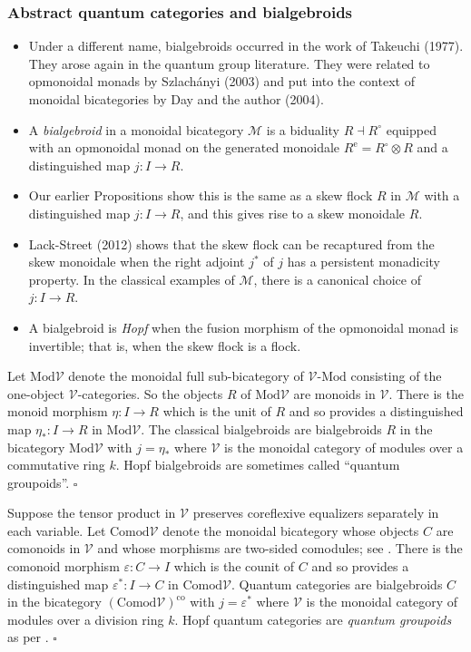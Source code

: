 \documentclass{beamer}
\newcommand{\lra}{\longrightarrow}
\def\CM{{\mathscr M}}
\def\CV{{\mathscr V}}
\begin{document}
 \begin{frame}
  \frametitle{Abstract quantum categories and bialgebroids}
\begin{itemize}
\item Under a different name, bialgebroids occurred in the work of Takeuchi (1977). 
They arose again in the quantum group literature.
They were related to opmonoidal monads by Szlach\'anyi (2003) and put into the context
of monoidal bicategories by Day and the author (2004). 
\pause
\item A {\em bialgebroid} in a monoidal bicategory $\CM$ is a biduality 
$R \dashv R^{\circ}$ equipped with an opmonoidal monad on the generated monoidale 
$R^{\mathrm{e}}=R^{\circ} \otimes R$ and a distinguished map $j:I\lra R$. 
\pause 
\item Our earlier Propositions show this is the same as a skew flock $R$ in $\CM$ with a distinguished map $j:I\lra R$, and this gives rise to a skew monoidale $R$. 
\pause
\item Lack-Street (2012) shows that the skew flock can be recaptured 
from the skew monoidale when the right adjoint $j^*$ of $j$ has a persistent monadicity property.
In the classical examples of $\CM$, there is a canonical choice of $j : I \lra R$.  
\pause
\item A bialgebroid is {\em Hopf} when the fusion morphism of the opmonoidal monad is invertible;
that is, when the skew flock is a flock.  
\end{itemize}

\begin{example} 
Let $\mathrm{Mod}\CV$ denote the monoidal full sub-bicategory of $\CV\text{-}\mathrm{Mod}$ 
consisting of the one-object $\CV$-categories. So the objects $R$ of $\mathrm{Mod}\CV$ are 
monoids in $\CV$. There is the monoid morphism $\eta : I \lra R$ which is the unit of $R$
and so provides a distinguished map $\eta_* : I \lra R$ in $\mathrm{Mod}\CV$. 
The classical bialgebroids are bialgebroids $R$ in the bicategory $\mathrm{Mod}\CV$ with $j = \eta_*$ where $\CV$ is the monoidal category of modules over a commutative ring $k$. 
Hopf bialgebroids are sometimes called ``quantum groupoids''.   $\square$   
\end{example}

\begin{example} 
Suppose the tensor product in $\CV$ preserves coreflexive equalizers separately in each variable.
Let $\mathrm{Comod}\CV$ denote the monoidal bicategory whose objects $C$ are 
comonoids in $\CV$ and whose morphisms are two-sided comodules; see \cite{QCat}. 
There is the comonoid morphism $\varepsilon : C \lra I$ which is the counit of $C$
and so provides a distinguished map $\varepsilon^* : I \lra C$ in $\mathrm{Comod}\CV$. 
Quantum categories are bialgebroids $C$ in the bicategory $(\mathrm{Comod}\CV)^{\mathrm{co}}$ with $j = \varepsilon^*$ where $\CV$ is the monoidal category of modules over a division ring $k$.
Hopf quantum categories are {\em quantum groupoids} as per \cite{ChLaSt}.   $\square$
\end{example}


\end{frame}
\end{document}
